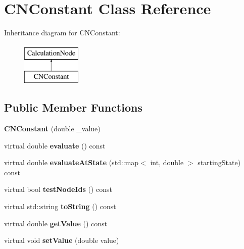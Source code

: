 \hypertarget{classCNConstant}{}\section{C\+N\+Constant Class Reference}
\label{classCNConstant}
Inheritance diagram for C\+N\+Constant\+:\begin{figure}[H]
\begin{center}
\leavevmode
\includegraphics[height=2.000000cm]{classCNConstant}
\end{center}
\end{figure}
\subsection*{Public Member Functions}
\begin{DoxyCompactItemize}
\item 
{\bfseries C\+N\+Constant} (double \+\_\+value)\hypertarget{classCNConstant_a0cf39e7ec935e90a472f8bf4fd784fa2}{}\label{classCNConstant_a0cf39e7ec935e90a472f8bf4fd784fa2}

\item 
virtual double {\bfseries evaluate} () const \hypertarget{classCNConstant_af8f9ed8124c661e1dd31df7e6eed94c3}{}\label{classCNConstant_af8f9ed8124c661e1dd31df7e6eed94c3}

\item 
virtual double {\bfseries evaluate\+At\+State} (std\+::map$<$ int, double $>$ starting\+State) const \hypertarget{classCNConstant_a00d59d4252567658adfc516169645ff5}{}\label{classCNConstant_a00d59d4252567658adfc516169645ff5}

\item 
virtual bool {\bfseries test\+Node\+Ids} () const \hypertarget{classCNConstant_aaa0511d5aa204f30769f2a3a33f78f91}{}\label{classCNConstant_aaa0511d5aa204f30769f2a3a33f78f91}

\item 
virtual std\+::string {\bfseries to\+String} () const \hypertarget{classCNConstant_abd2085b23c5a3502b645068caf53a43f}{}\label{classCNConstant_abd2085b23c5a3502b645068caf53a43f}

\item 
virtual double {\bfseries get\+Value} () const \hypertarget{classCNConstant_ac416282fca8424c0f3d6d65fa2b96f20}{}\label{classCNConstant_ac416282fca8424c0f3d6d65fa2b96f20}

\item 
virtual void {\bfseries set\+Value} (double value)\hypertarget{classCNConstant_a964d75e6934098c33853009a43685a0e}{}\label{classCNConstant_a964d75e6934098c33853009a43685a0e}

\end{DoxyCompactItemize}
